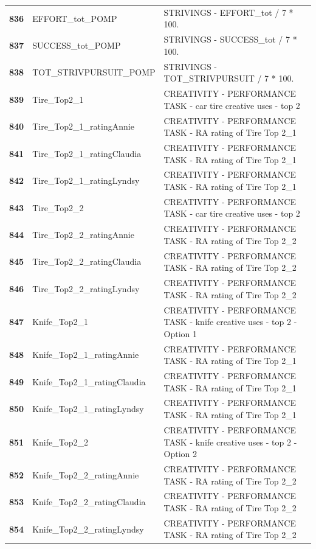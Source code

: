 \documentclass[
  letterpaper,
  DIV=11,
  numbers=noendperiod]{scrartcl}
\begin{document}
\begin{longtable}[t]{>{}cll}
\addlinespace
\textbf{836} & EFFORT\_tot\_POMP & STRIVINGS - EFFORT\_tot / 7 * 100.\\
\textbf{837} & SUCCESS\_tot\_POMP & STRIVINGS - SUCCESS\_tot / 7 * 100.\\
\textbf{838} & TOT\_STRIVPURSUIT\_POMP & STRIVINGS - TOT\_STRIVPURSUIT / 7 * 100.\\
\textbf{839} & Tire\_Top2\_1 & CREATIVITY - PERFORMANCE TASK - car tire creative uses - top 2\\
\textbf{840} & Tire\_Top2\_1\_ratingAnnie & CREATIVITY - PERFORMANCE TASK - RA rating of Tire Top 2\_1\\
\addlinespace
\textbf{841} & Tire\_Top2\_1\_ratingClaudia & CREATIVITY - PERFORMANCE TASK - RA rating of Tire Top 2\_1\\
\textbf{842} & Tire\_Top2\_1\_ratingLyndsy & CREATIVITY - PERFORMANCE TASK - RA rating of Tire Top 2\_1\\
\textbf{843} & Tire\_Top2\_2 & CREATIVITY - PERFORMANCE TASK - car tire creative uses - top 2\\
\textbf{844} & Tire\_Top2\_2\_ratingAnnie & CREATIVITY - PERFORMANCE TASK - RA rating of Tire Top 2\_2\\
\textbf{845} & Tire\_Top2\_2\_ratingClaudia & CREATIVITY - PERFORMANCE TASK - RA rating of Tire Top 2\_2\\
\addlinespace
\textbf{846} & Tire\_Top2\_2\_ratingLyndsy & CREATIVITY - PERFORMANCE TASK - RA rating of Tire Top 2\_2\\
\textbf{847} & Knife\_Top2\_1 & CREATIVITY - PERFORMANCE TASK - knife creative uses - top 2 - Option 1\\
\textbf{848} & Knife\_Top2\_1\_ratingAnnie & CREATIVITY - PERFORMANCE TASK - RA rating of Tire Top 2\_1\\
\textbf{849} & Knife\_Top2\_1\_ratingClaudia & CREATIVITY - PERFORMANCE TASK - RA rating of Tire Top 2\_1\\
\textbf{850} & Knife\_Top2\_1\_ratingLyndsy & CREATIVITY - PERFORMANCE TASK - RA rating of Tire Top 2\_1\\
\addlinespace
\textbf{851} & Knife\_Top2\_2 & CREATIVITY - PERFORMANCE TASK - knife creative uses - top 2 - Option 2\\
\textbf{852} & Knife\_Top2\_2\_ratingAnnie & CREATIVITY - PERFORMANCE TASK - RA rating of Tire Top 2\_2\\
\textbf{853} & Knife\_Top2\_2\_ratingClaudia & CREATIVITY - PERFORMANCE TASK - RA rating of Tire Top 2\_2\\
\textbf{854} & Knife\_Top2\_2\_ratingLyndsy & CREATIVITY - PERFORMANCE TASK - RA rating of Tire Top 2\_2\\

\end{longtable}
\end{document}
